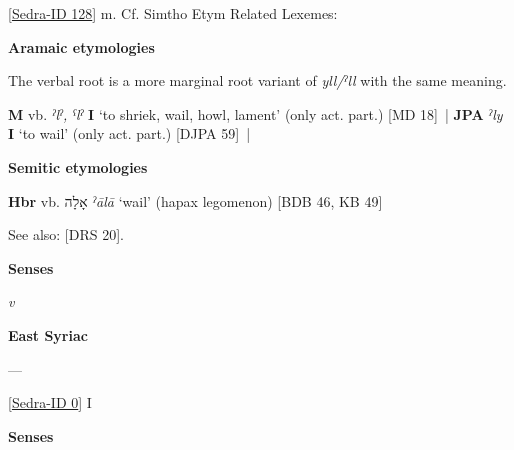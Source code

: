 \documentclass[10pt, a4paper, twocolumn, twoside]{book}
\begin{document}
    


    \hypertarget{g968bc047-871e-4149-b316-0be8c4fabb93}{}

    \bigskip{}\begin{huge}\end{huge} [\href{https://sedra.bethmardutho.org/lexeme/get/128}{Sedra-ID 128}] m. Cf. Simtho Etym Related Lexemes: \textsyriac{\hyperlink{ge4f9ab4a-9488-438a-9de9-4cad1028b559}{}}

    

    \smallskip
    \textbf{Aramaic etymologies}

    \begin{footnotesize}The verbal root is a more marginal root variant of \textit{yll/ˀll} with the same meaning. \end{footnotesize}

        \textbf{M} vb. \textit{ˀlˀ\textup{,} ˁlˀ} \textbf{I} `to shriek, wail, howl, lament'  (only act. part.) [MD 18]~| \textbf{JPA} \textit{ˀly} \textbf{I} `to wail'  (only act. part.) [DJPA 59]~| 

        \smallskip
        \textbf{Semitic etymologies}

         \textbf{Hbr} vb. \textup{\texthebrew{אָלָה}} \textit{ˀālā} `wail' (hapax legomenon) [BDB 46, KB 49]

    \begin{footnotesize}See also: [DRS 20].\end{footnotesize}

    \medskip{}
    \textbf{Senses}

    

    \textit{v}

    \textbf{East Syriac \textsyriac{}}


    \medskip{} --- 
    \begin{Large}\textsyriac{\hyperlink{ga3c40da0-c81f-47f1-a7d9-a28ccce12edb}{}}\end{Large} [\href{https://sedra.bethmardutho.org/lexeme/get/0}{Sedra-ID 0}] I

    \medskip{}
    \textbf{Senses}
\end{document}
